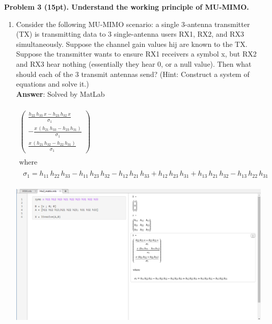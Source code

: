 \documentclass[12pt]{article}
\begin{document}
\noindent \textbf{Problem 3 (15pt). Understand the working principle of MU-MIMO.\\}
\begin{enumerate}
\item  Consider the following MU-MIMO scenario: a single 3-antenna transmitter (TX) is
transmitting data to 3 single-antenna users RX1, RX2, and RX3 simultaneously. Suppose the
channel gain values hij are known to the TX. Suppose the transmitter wants to ensure RX1
receivers a symbol x, but RX2 and RX3 hear nothing (essentially they hear 0, or a null value).
Then what should each of the 3 transmit antennas send? (Hint: Construct a system of equations
and solve it.)\\
\textbf{Answer}: Solved by MatLab\\\\
$\begin{array}{l}
\left(\begin{array}{c}
\frac{h_{22} \,h_{33} \,x-h_{23} \,h_{32} \,x}{\sigma_1 }\\
-\frac{x\,{\left(h_{21} \,h_{33} -h_{23} \,h_{31} \right)}}{\sigma_1 }\\
\frac{x\,{\left(h_{21} \,h_{32} -h_{22} \,h_{31} \right)}}{\sigma_1 }
\end{array}\right)\\
\mathrm{}\\
\textrm{where}\\
\mathrm{}\\
\;\;\sigma_1 =h_{11} \,h_{22} \,h_{33} -h_{11} \,h_{23} \,h_{32} -h_{12} \,h_{21} \,h_{33} +h_{12} \,h_{23} \,h_{31} +h_{13} \,h_{21} \,h_{32} -h_{13} \,h_{22} \,h_{31} 
\end{array}$\\\\
\includegraphics[scale=0.5]{HW4_Q3a).png}\\\\


\end{enumerate}
\end{document}
